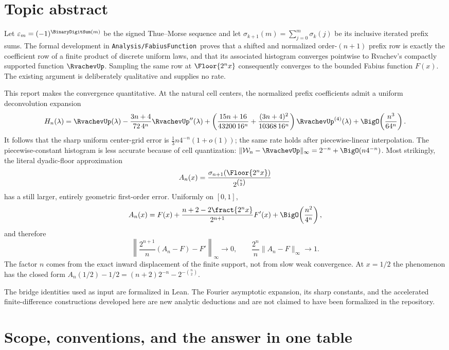 \documentclass[11pt,oneside]{article}
\theoremstyle{definition}
\theoremstyle{remark}
\newcommand{\repo}{\nolinkurl{Analysis/FabiusFunction}}
\begin{document}
\section*{Topic abstract}
Let $\varepsilon_m=(-1)^{\BinaryDigitSum(m)}$ be the signed Thue--Morse sequence and let
$\sigma_{k+1}(m)=\sum_{j=0}^{m}\sigma_k(j)$ be its inclusive iterated prefix sums.  The
formal development in \repo\ proves that a shifted and normalized order-$(n+1)$ prefix row
is exactly the coefficient row of a finite product of discrete uniform laws, and that its
associated histogram converges pointwise to Rvachev's compactly supported function $\RvachevUp$.
Sampling the same row at $\Floor{2^n x}$ consequently converges to the bounded Fabius
function $F(x)$.  The existing argument is deliberately qualitative and supplies no rate.

This report makes the convergence quantitative.  At the natural cell centers, the normalized
prefix coefficients admit a uniform deconvolution expansion
\[
 H_n(\lambda)=\RvachevUp(\lambda)
 -\frac{3n+4}{72\,4^n}\RvachevUp''(\lambda)
 +\left(\frac{15n+16}{43200\,16^n}
       +\frac{(3n+4)^2}{10368\,16^n}\right)\RvachevUp^{(4)}(\lambda)
 +\BigO\!\left(\frac{n^3}{64^n}\right).
\]
It follows that the sharp uniform center-grid error is
$\frac13 n4^{-n}(1+o(1))$; the same rate holds after piecewise-linear interpolation.
The piecewise-constant histogram is less accurate because of cell quantization:
$\|\mathcal W_n-\RvachevUp\|_\infty=2^{-n}+\BigO(n4^{-n})$.
Most strikingly, the literal dyadic-floor approximation
\[
 A_n(x)=\frac{\sigma_{n+1}(\Floor{2^n x})}{2^{\binom n2}}
\]
has a still larger, entirely geometric first-order error.  Uniformly on $[0,1]$,
\[
 A_n(x)=F(x)+\frac{n+2-2\fract{2^nx}}{2^{n+1}}F'(x)
          +\BigO\!\left(\frac{n^2}{4^n}\right),
\]
and therefore
\[
 \left\|\frac{2^{n+1}}n(A_n-F)-F'\right\|_\infty\longrightarrow0,
 \qquad
 \frac{2^n}{n}\|A_n-F\|_\infty\longrightarrow1.
\]
The factor $n$ comes from the exact inward displacement of the finite support, not from slow
weak convergence.  At $x=1/2$ the phenomenon has the closed form
$A_n(1/2)-1/2=(n+2)2^{-n}-2^{-\binom n2}$.

The bridge identities used as input are formalized in Lean.  The Fourier asymptotic expansion,
its sharp constants, and the accelerated finite-difference constructions developed here are
new analytic deductions and are not claimed to have been formalized in the repository.


\section{Scope, conventions, and the answer in one table}
\label{tmrates:sec:scope}
\end{document}
